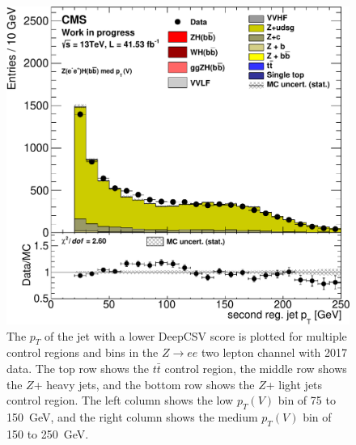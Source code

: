 \begin{figure}
  \includegraphics[width=0.42\linewidth]{figures/2017_Zee/Zlf_med_Zee__Hj1_pt_reg_.pdf}
  \caption[Control region plots for two electrons in 2017]{
    The $p_T$ of the jet with a lower DeepCSV score is plotted for
    multiple control regions and bins in
    the $Z\rightarrow ee$ two lepton channel with 2017 data.
    The top row shows the $t\bar{t}$ control region,
    the middle row shows the $Z$+ heavy jets,
    and the bottom row shows the $Z$+ light jets control region.
    The left column shows the low $p_T(V)$ bin of 75 to \SI{150}{GeV},
    and the right column shows the medium $p_T(V)$ bin of 150 to \SI{250}{GeV}.
  }
  \label{fig:2017_Zee_j1pt}
\end{figure}

